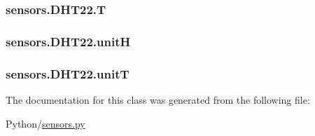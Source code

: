 \subsubsection[{\texorpdfstring{T}{T}}]{\setlength{\rightskip}{0pt plus 5cm}sensors.\+D\+H\+T22.\+T}\hypertarget{classsensors_1_1DHT22_af42b72d6f11a320fe7e94a23734a109e}{}\label{classsensors_1_1DHT22_af42b72d6f11a320fe7e94a23734a109e}
\subsubsection[{\texorpdfstring{unitH}{unitH}}]{\setlength{\rightskip}{0pt plus 5cm}sensors.\+D\+H\+T22.\+unitH}\hypertarget{classsensors_1_1DHT22_a9055341fda2f3628ef888a39254d1c83}{}\label{classsensors_1_1DHT22_a9055341fda2f3628ef888a39254d1c83}
\subsubsection[{\texorpdfstring{unitT}{unitT}}]{\setlength{\rightskip}{0pt plus 5cm}sensors.\+D\+H\+T22.\+unitT}\hypertarget{classsensors_1_1DHT22_a9fab2812780c9f861d4bf8adc4d287d6}{}\label{classsensors_1_1DHT22_a9fab2812780c9f861d4bf8adc4d287d6}


The documentation for this class was generated from the following file\+:\begin{DoxyCompactItemize}
\item 
Python/\hyperlink{sensors_8py}{sensors.\+py}\end{DoxyCompactItemize}

